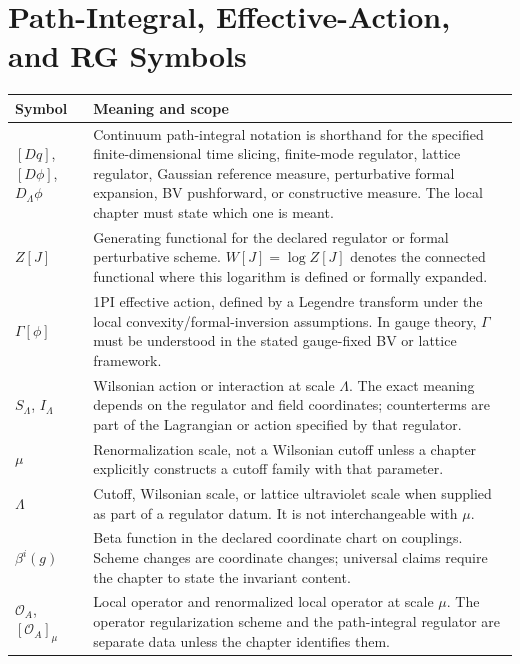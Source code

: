 \section*{Path-Integral, Effective-Action, and RG Symbols}

\begin{longtable}{>{\raggedright\arraybackslash}p{}
                  >{\raggedright\arraybackslash}p{}}
\hline
\textbf{Symbol} & \textbf{Meaning and scope}\\
\hline
\endhead
\([Dq]\), \([D\phi]\), \(D_\Lambda\phi\) &
Continuum path-integral notation is shorthand for the specified
finite-dimensional time slicing, finite-mode regulator, lattice regulator,
Gaussian reference measure, perturbative formal expansion, BV pushforward, or
constructive measure.  The local chapter must state which one is meant.\\
\(Z[J]\) &
Generating functional for the declared regulator or formal perturbative
scheme.  \(W[J]=\log Z[J]\) denotes the connected functional where this
logarithm is defined or formally expanded.\\
\(\Gamma[\phi]\) &
1PI effective action, defined by a Legendre transform under the local
convexity/formal-inversion assumptions.  In gauge theory, \(\Gamma\) must be
understood in the stated gauge-fixed BV or lattice framework.\\
\(S_\Lambda\), \(I_\Lambda\) &
Wilsonian action or interaction at scale \(\Lambda\).  The exact meaning
depends on the regulator and field coordinates; counterterms are part of the
Lagrangian or action specified by that regulator.\\
\(\mu\) &
Renormalization scale, not a Wilsonian cutoff unless a chapter explicitly
constructs a cutoff family with that parameter.\\
\(\Lambda\) &
Cutoff, Wilsonian scale, or lattice ultraviolet scale when supplied as part
of a regulator datum.  It is not interchangeable with \(\mu\).\\
\(\beta^i(g)\) &
Beta function in the declared coordinate chart on couplings.  Scheme changes
are coordinate changes; universal claims require the chapter to state the
invariant content.\\
\(\mathcal O_A\), \([\mathcal O_A]_\mu\) &
Local operator and renormalized local operator at scale \(\mu\).  The
operator regularization scheme and the path-integral regulator are separate
data unless the chapter identifies them.\\
\hline
\end{longtable}

